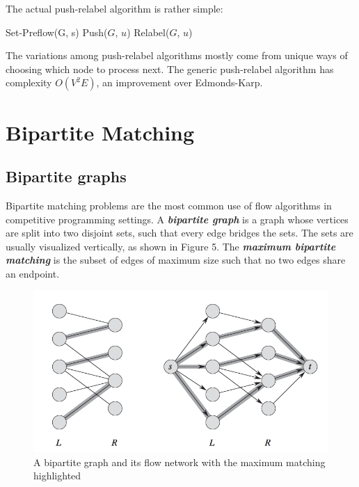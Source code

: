 \documentclass[11pt, oneside]{article}
\newcommand{\smallemphasis}[1]{\textbf{\textit{#1}}}
\begin{document}
The actual push-relabel algorithm is rather simple:
\newpage
\begin{algorithm}
  \begin{algorithmic}[h!]
      \State Set-Preflow(G, s)
            \State Push($G$, $u$)
         \Else
            \State Relabel($G$, $u$)
         \EndIf
      \EndWhile
    \EndProcedure
  \end{algorithmic}
\end{algorithm}


The variations among push-relabel algorithms mostly come from unique ways of choosing which node to process next. The generic push-relabel algorithm has complexity \( O(V^2 E) \), an improvement over Edmonds-Karp.


\section{Bipartite Matching}

\subsection{Bipartite graphs}

Bipartite matching problems are the most common use of flow algorithms in competitive programming settings. A \smallemphasis{bipartite graph} is a graph whose vertices are split into two disjoint sets, such that every edge bridges the sets. The sets are usually visualized vertically, as shown in Figure 5. The \smallemphasis{maximum bipartite matching} is the subset of edges of maximum size such that no two edges share an endpoint.

\begin{figure}[H]
\centering
\includegraphics[scale=0.75]{maximum-bipartite-matching}
\caption{A bipartite graph and its flow network with the maximum matching highlighted}
\end{figure}
\end{document}

